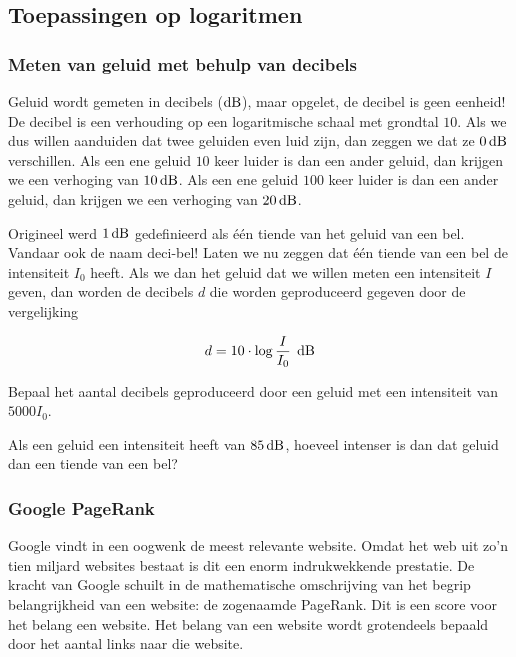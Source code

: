 \documentclass[12pt,twoside]{article}
\begin{document}
\subsection{Toepassingen op logaritmen}

\subsubsection{Meten van geluid met behulp van decibels}

Geluid wordt gemeten in decibels ($\dB$), maar opgelet, de decibel is geen eenheid! De decibel is een verhouding op een logaritmische schaal met grondtal $10$. Als we dus willen aanduiden dat twee geluiden even luid zijn, dan zeggen we dat ze $0\dB$ verschillen. Als een ene geluid $10$ keer luider is dan een ander geluid, dan krijgen we een verhoging van $10\dB$. Als een ene geluid $100$ keer luider is dan een ander geluid, dan krijgen we een verhoging van $20\dB$.

Origineel werd $1\dB$ gedefinieerd als één tiende van het geluid van een bel. Vandaar ook de naam deci-bel! Laten we nu zeggen dat één tiende van een bel de intensiteit $I_0$ heeft. Als we dan het geluid dat we willen meten een intensiteit $I$ geven, dan worden de decibels $d$ die worden geproduceerd gegeven door de vergelijking

$$d=10\cdot \log\dfrac{I}{I_0} \;\dB$$

\begin{oefening}
Bepaal het aantal decibels geproduceerd door een geluid met een intensiteit van $5000I_0$.
\end{oefening}

\begin{oefening}
Als een geluid een intensiteit heeft van $85\dB$, hoeveel intenser is dan dat geluid dan een tiende van een bel?
\end{oefening}

\subsubsection{Google PageRank}

Google vindt in een oogwenk de meest relevante website. Omdat het web uit zo’n tien miljard websites bestaat is dit een enorm indrukwekkende prestatie. De kracht van Google schuilt in de mathematische omschrijving van het begrip belangrijkheid van een website: de zogenaamde PageRank. Dit is een score voor het belang een website. Het belang van een website wordt grotendeels bepaald door het aantal links naar die website.\\
\end{document}
